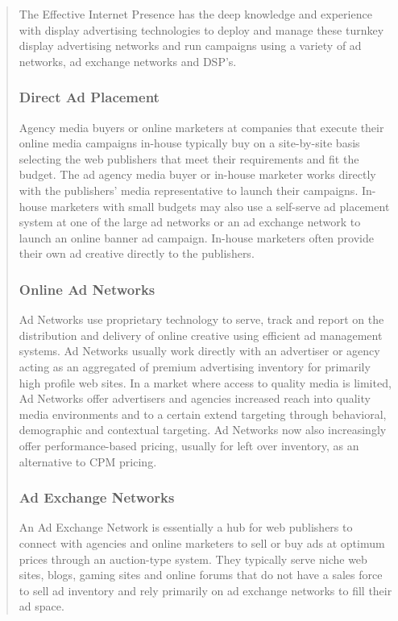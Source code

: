 \documentclass[35pt]{report}
\begin{document}
\begin{quote}
The Effective Internet Presence has the deep knowledge and experience with display advertising technologies to deploy and manage these turnkey display advertising networks and run campaigns using a variety of ad networks, ad exchange networks and DSP's.

			\subsubsection{Direct Ad Placement}
Agency media buyers or online marketers at companies that execute their online media campaigns in-house typically buy on a site-by-site basis selecting the web publishers that meet their requirements and fit the budget. The ad agency media buyer or in-house marketer works directly with the publishers' media representative to launch their campaigns. In-house marketers with small budgets may also use a self-serve ad placement system at one of the large ad networks or an ad exchange network to launch an online banner ad campaign. In-house marketers often provide their own ad creative directly to the publishers.

			\subsubsection{Online Ad Networks}
Ad Networks use proprietary technology to serve, track and report on the distribution and delivery of online creative using efficient ad management systems. Ad Networks usually work directly with an advertiser or agency acting as an aggregated of premium advertising inventory for primarily high profile web sites. In a market where access to quality media is limited, Ad Networks offer advertisers and agencies increased reach into quality media environments and to a certain extend targeting through behavioral, demographic and contextual targeting. Ad Networks now also increasingly offer performance-based pricing, usually for left over inventory, as an alternative to CPM pricing.

			\subsubsection{Ad Exchange Networks}
An Ad Exchange Network is essentially a hub for web publishers to connect with agencies and online marketers to sell or buy ads at optimum prices through an auction-type system. They typically serve niche web sites, blogs, gaming sites and online forums that do not have a sales force to sell ad inventory and rely primarily on ad exchange networks to fill their ad space.


\end{quote}
\end{document}
